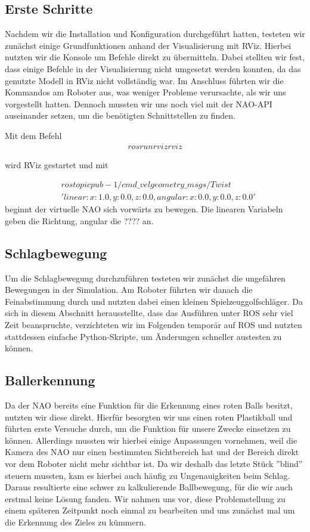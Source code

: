 \documentclass{scrartcl}
\begin{document}
\subsection{Erste Schritte}

Nachdem wir die Installation und Konfiguration durchgeführt hatten, testeten wir zunächst einige Grundfunktionen anhand der Visualisierung mit RViz.
Hierbei nutzten wir die Konsole um Befehle direkt zu übermitteln. Dabei stellten wir fest, dass einige Befehle in der Visualisierung nicht umgesetzt werden konnten, da das genutzte Modell in RViz nicht vollständig war.
Im Anschluss führten wir die Kommandos am Roboter aus, was weniger Probleme verursachte, als wir uns vorgestellt hatten. 
Dennoch mussten wir uns noch viel mit der NAO-API auseinander setzen, um die benötigten Schnittstellen zu finden.

Mit dem Befehl
\begin{align}
rosrun rviz rviz
\end{align}

wird RViz gestartet und mit 

\begin{align}
&rostopic pub -1 /cmd\_vel geometry\_msgs/Twist\\ &'{linear: {x: 1.0, y: 0.0, z: 0.0},angular: {x: 0.0, y: 0.0, z: 0.0}}'
\end{align}
beginnt der virtuelle NAO sich vorwärts zu bewegen. Die linearen Variabeln geben die Richtung, angular die ???? an.

\subsection{Schlagbewegung}

Um die Schlagbewegung durchzuführen testeten wir zunächst die ungefähren Bewegungen in der Simulation. Am Roboter führten wir danach die Feinabstimmung durch und nutzten dabei einen kleinen Spielzeuggolfschläger. 
Da sich in diesem Abschnitt herausstellte, dass das Ausführen unter ROS sehr viel Zeit beanspruchte, verzichteten wir im Folgenden temporär auf ROS und nutzten stattdessen einfache Python-Skripte, um Änderungen schneller austesten zu können.

\subsection{Ballerkennung}

Da der NAO bereits eine Funktion für die Erkennung eines roten Balls besitzt, nutzten wir diese direkt. Hierfür besorgten wir uns einen roten Plastikball und führten erste Versuche durch, um die Funktion für unsere Zwecke einsetzen zu können.
Allerdings mussten wir hierbei einige Anpassungen vornehmen, weil die Kamera des NAO nur einen bestimmten Sichtbereich hat und der Bereich direkt vor dem Roboter nicht mehr sichtbar ist. Da wir deshalb das letzte Stück ''blind'' steuern mussten, kam es hierbei auch häufig zu Ungenauigkeiten beim Schlag. Daraus resultierte eine schwer zu kalkulierende Ballbewegung, für die wir auch erstmal keine Lösung fanden. Wir nahmen uns vor, diese Problemstellung zu einem späteren Zeitpunkt noch einmal zu bearbeiten und uns zunächst mal um die Erkennung des Zieles zu kümmern.
\end{document}
